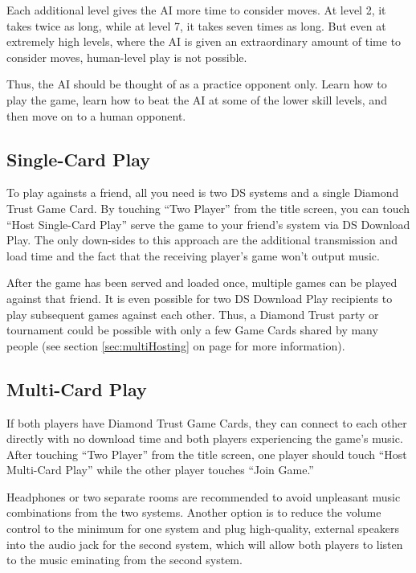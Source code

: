 \documentclass[8pt]{extbook}
\begin{document}
Each additional level gives the AI more time to consider moves.  At level 2, it takes twice as long, while at level 7, it takes seven times as long.  But even at extremely high levels, where the AI is given an extraordinary amount of time to consider moves, human-level play is not possible.

Thus, the AI should be thought of as a practice opponent only.  Learn how to play the game, learn how to beat the AI at some of the lower skill levels, and then move on to a human opponent.  

\subsection{Single-Card Play}
\label{sec:singleCard}
To play againsts a friend, all you need is two DS systems and a single Diamond Trust Game Card.  By touching ``Two Player'' from the title screen, you can touch ``Host Single-Card Play'' serve the game to your friend's system via DS Download Play.  The only down-sides to this approach are the additional transmission and load time and the fact that the receiving player's game won't output music.

After the game has been served and loaded once, multiple games can be played against that friend.  It is even possible for two DS Download Play recipients to play subsequent games against each other.  Thus, a Diamond Trust party or tournament could be possible with only a few Game Cards shared by many people (see section \ref{sec:multiHosting} on page \pageref{sec:multiHosting} for more information).
 

\subsection{Multi-Card Play}
If both players have Diamond Trust Game Cards, they can connect to each other directly with no download time and both players experiencing the game's music.  After touching ``Two Player'' from the title screen, one player should touch ``Host Multi-Card Play'' while the other player touches ``Join Game.''

Headphones or two separate rooms are recommended to avoid unpleasant music combinations from the two systems.  Another option is to reduce the volume control to the minimum for one system and plug high-quality, external speakers into the audio jack for the second system, which will allow both players to listen to the music eminating from the second system.
\end{document}
